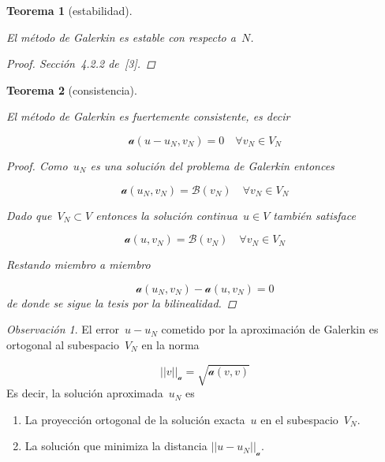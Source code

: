\documentclass[
  12pt,
  a4paper,
  table]{scrbook}
\providecommand{\tightlist}{%
  \setlength{\itemsep}{0pt}\setlength{\parskip}{0pt}}\usepackage{longtable,booktabs,array}
\theoremstyle{plain}
\theoremstyle{definition}
\theoremstyle{plain}
\newtheorem{theorem}{Teorema}[chapter]
\theoremstyle{plain}
\theoremstyle{remark}
\newtheorem*{remark}{Observación}
\begin{document}
\begin{theorem}[estabilidad]\protect\hypertarget{thm-galerkin-estabilidad}{}\label{thm-galerkin-estabilidad}

El método de Galerkin es estable con respecto a~\(N\).

\begin{proof}

Sección~4.2.2 de~{[}3{]}.

\end{proof}

\end{theorem}

\begin{theorem}[consistencia]\protect\hypertarget{thm-galerkin-consistencia}{}\label{thm-galerkin-consistencia}

El método de Galerkin es fuertemente consistente, es decir

\[
\mathcal{a}(u - u_N, v_N) = 0 \quad \forall v_N \in V_N
\]

\begin{proof}

Como~\(u_N\) es una solución del problema de Galerkin entonces

\[
\mathcal{a}(u_N, v_N) = \mathcal{B}(v_N) \quad \forall v_N \in V_N
\]

Dado que~\(V_N \subset V\) entonces la solución continua~\(u \in V\)
también satisface

\[
\mathcal{a}(u, v_N) = \mathcal{B}(v_N) \quad \forall v_N \in V_N
\]

Restando miembro a miembro

\[
\mathcal{a}(u_N, v_N) - \mathcal{a}(u, v_N) = 0
\] de donde se sigue la tesis por la bilinealidad.

\end{proof}

\end{theorem}

\begin{remark}

El error~\(u - u_N\) cometido por la aproximación de Galerkin es
ortogonal al subespacio~\(V_N\) en la norma

\[
||v||_{\mathcal{a}} = \sqrt{\mathcal{a}(v,v)}
\] Es decir, la solución aproximada~\(u_N\) es

\begin{enumerate}
\def\labelenumi{\arabic{enumi}.}
\tightlist
\item
  La proyección ortogonal de la solución exacta~\(u\) en el
  subespacio~\(V_N\).
\item
  La solución que minimiza la distancia \(||u -u_N||_{\mathcal{a}}\).
\end{enumerate}

\end{remark}
\end{document}

